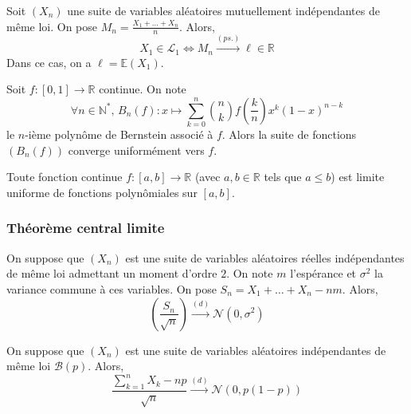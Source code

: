 	
	\begin{theorem}
		Soit $(X_n)$ une suite de variables aléatoires mutuellement indépendantes de même loi. On pose $M_n = \frac{X_1 + \dots + X_n}{n}$. Alors,
		\[ X_1 \in \mathcal{L}_1 \iff M_n \overset{(ps.)}{\longrightarrow} \ell \in \mathbb{R} \]
		Dans ce cas, on a $\ell = \mathbb{E}(X_1)$.
	\end{theorem}
	
	
	\begin{application}
		Soit $f : [0,1] \rightarrow \mathbb{R}$ continue. On note
		\[ \forall n \in \mathbb{N}^*, \, B_n(f) : x \mapsto \sum_{k=0}^n \binom{n}{k} f \left( \frac{k}{n} \right) x^k (1-x)^{n-k} \]
		le $n$-ième polynôme de Bernstein associé à $f$. Alors la suite de fonctions $(B_n(f))$ converge uniformément vers $f$.
	\end{application}
	
	
	\begin{corollary}
		Toute fonction continue $f : [a,b] \rightarrow \mathbb{R}$ (avec $a, b \in \mathbb{R}$ tels que $a \leq b$) est limite uniforme de fonctions polynômiales sur $[a, b]$.
	\end{corollary}
	
	\newpage
	\subsubsection{Théorème central limite}
	
	
	\begin{theorem}
		On suppose que $(X_n)$ est une suite de variables aléatoires réelles indépendantes de même loi admettant un moment d'ordre $2$. On note $m$ l'espérance et $\sigma^2$ la variance commune à ces variables. On pose $S_n = X_1 + \dots + X_n - nm$. Alors,
		\[ \left ( \frac{S_n}{\sqrt{n}} \right) \overset{(d)}{\longrightarrow} \mathcal{N}(0, \sigma^2) \]
	\end{theorem}
	
	\begin{application}
		On suppose que $(X_n)$ est une suite de variables aléatoires indépendantes de même loi $\mathcal{B}(p)$. Alors,
		\[ \frac{\sum_{k=1}^{n} X_k - np}{\sqrt{n}} \overset{(d)}{\longrightarrow} \mathcal{N}(0, p(1-p)) \]
	\end{application}
	
